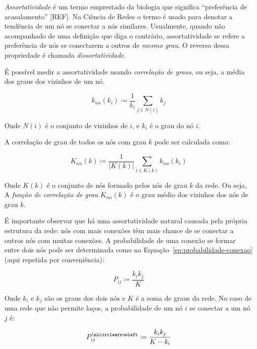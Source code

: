 \documentclass[12pt,a4paper]{article}
\theoremstyle{hypo}
\newcommand{\defn}{\coloneqq} %
\newcommand{\noloop}[1]{#1^\nlcirclearrowleft} %
\begin{document}
\textit{Assortatividade} é um termo emprestado da biologia que significa \enquote{preferência de acasalamento} [REF]. Na Ciência de Redes o termo é usado para denotar a tendência de um nó se conectar a nós similares. Usualmente, quando não acompanhado de uma definição que diga o contrário, assortatividade se refere a preferência de nós se conectarem a outros de \textit{mesmo grau}. O reverso dessa propriedade é chamada \textit{dissortatividade}.

É possível medir a assortatividade usando \textit{correlação de graus}, ou seja, a média dos graus dos vizinhos de um nó.

\begin{equation}
k_\textit{nn}(k_i) \defn \frac{1}{k_i} \sum_{j \in N(i)} k_j
\end{equation}

Onde $N(i)$ é o conjunto de vizinhos de $i$, e $k_i$ é o grau do nó $i$.

A correlação de grau de todos os nós com grau $k$ pode ser calculada como:

\begin{equation}
K_\textit{nn}(k) \defn \frac{1}{|K(k)|} \sum_{i \in K(k)} k_\textit{nn}(k_i)
\end{equation}

Onde $K(k)$ é o conjunto de nós formado pelos nós de grau $k$ da rede. Ou seja, A \textit{função de correlação de grau} $K_\textit{nn}(k)$ é o grau médio dos vizinhos dos nós de grau $k$.

É importante observar que há uma assortatividade natural causada pela própria estrutura da rede: nós com mais conexões têm mais chance de se conectar a outros nós com muitas conexões. A probabilidade de uma conexão se formar entre dois nós pode ser determinada como na Equação~\ref{eq:probabilidade-conexao} (aqui repetida por conveniência):

\begin{equation} \label{eq:probabilidade-assortativa}
P_{ij} \defn \frac{k_i k_j}{K}
\end{equation}

Onde $k_i$ e $k_j$ são os graus dos dois nós e $K$ é a soma de graus da rede. No caso de uma rede que não permite laços, a probabilidade de um nó $i$ se conectar a um nó $j$ é:~

\begin{equation}
\noloop{P}_{ij} \defn \frac{k_i k_j}{K - k_i}
\end{equation}
\end{document}
